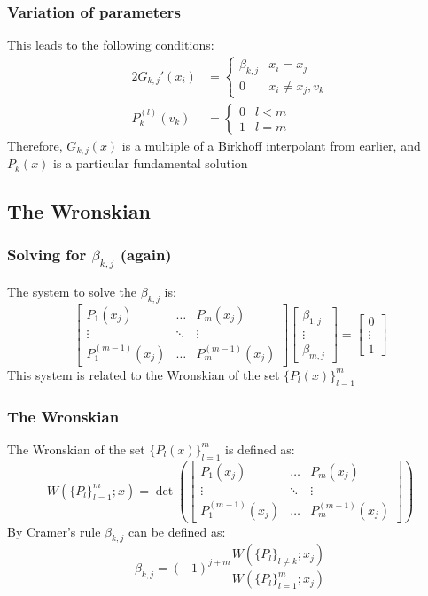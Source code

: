 \documentclass[handout]{beamer}
\begin{document}
\begin{frame}
\frametitle{Variation of parameters}
This leads to the following conditions:
\begin{alignat*}{2}
G_{k,j}'(x_i) & = \begin{cases} \beta_{k,j} & x_i = x_j \\ 0 & x_i \neq x_j, v_k \end{cases} \\
P_k^{(l)}(v_k) & = \begin{cases} 0 & l < m \\ 1 & l =m \end{cases}
\end{alignat*}
Therefore, $G_{k,j}(x)$ is a multiple of a Birkhoff interpolant from earlier, and $P_k(x)$ is a particular fundamental solution
\end{frame}

\subsection{The Wronskian}

\begin{frame}
\frametitle{Solving for $\beta_{k,j}$ (again)}
The system to solve the $\beta_{k,j}$ is:
\begin{equation*}
\begin{bmatrix} P_1(x_j) & \dots & P_m(x_j) \\
\vdots & \ddots & \vdots \\
P_1^{(m-1)}(x_j) & \dots & P_m^{(m-1)}(x_j) \end{bmatrix}
\begin{bmatrix} \beta_{1,j} \\ \vdots \\ \beta_{m,j} \end{bmatrix} = 
\begin{bmatrix} 0 \\ \vdots \\ 1 \end{bmatrix}
\end{equation*}
This system is related to the Wronskian of the set $\{ P_l(x) \}_{l=1}^m$
\end{frame}

\begin{frame}
\frametitle{The Wronskian}
The Wronskian of the set $\{ P_l(x) \}_{l=1}^m$ is defined as:
\begin{equation*}
W(\{P_l\}_{l=1}^m ; x) = \det \left ( \begin{bmatrix} P_1(x_j) & \dots & P_m(x_j) \\
\vdots & \ddots & \vdots \\
P_1^{(m-1)}(x_j) & \dots & P_m^{(m-1)}(x_j) \end{bmatrix} \right )
\end{equation*}
By Cramer's rule $\beta_{k,j}$ can be defined as:
\begin{equation*}
\beta_{k,j} = (-1)^{j + m} \frac{ W(\{P_l\}_{l \neq k} ; x_j ) }{ W(\{P_l\}_{l=1}^m ; x_j ) }
\end{equation*}
\end{frame}
\end{document}
